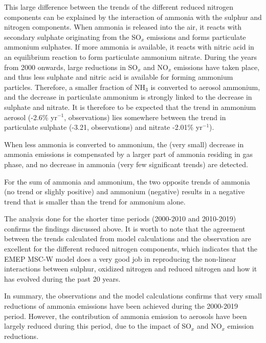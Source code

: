 This large difference between the trends of the different reduced nitrogen components can be explained by the interaction of ammonia with the sulphur and nitrogen components. When ammonia is released into the air, it reacts with secondary sulphate originating from the SO$_x$ emissions and forms particulate ammonium sulphates. If more ammonia is available, it reacts with nitric acid in an equilibrium reaction to form particulate ammonium nitrate. During the years from 2000 onwards, large reductions in SO$_x$ and NO$_x$ emissions have taken place, and thus less sulphate and nitric acid is available for forming ammonium particles. Therefore, a smaller fraction of NH$_3$ is converted to aerosol ammonium, and the decrease in particulate ammonium is strongly linked to the decrease in sulphate and nitrate. It is therefore to be expected that the trend in ammonium aerosol (-2.6\% yr$^{-1}$, observations) lies somewhere between the trend in particulate sulphate (-3.21, observations) and nitrate -2.01\% yr$^{-1}$). 

When less ammonia is converted to ammonium, the (very small) decrease in ammonia emissions is compensated by a larger part of ammonia residing in gas phase, and no decrease in ammonia (very few significant trends) are detected.

For the sum of ammonia and ammonium, the two opposite trends of ammonia (no trend or slighly positive) and ammonium (negative) results in a negative trend that is smaller than the trend for ammonium alone.

The analysis done for the shorter time periods (2000-2010 and 2010-2019) confirms the findings discussed above. It is worth to note that the agreement between the trends calculated from model calculations and the observation are excellent for the different reduced nitrogen components, which indicates that the EMEP MSC-W model does a very good job in reproducing the non-linear interactions between sulphur, oxidized nitrogen and reduced nitrogen and how it has evolved during the past 20 years.

In summary, the observations and the model calculations confirms that very small reductions of ammonia emissions have been achieved during the 2000-2019 period. However, the contribution of ammonia emission to aerosols have been largely reduced during this period, due to the impact of SO$_x$ and NO$_x$ emission reductions.






